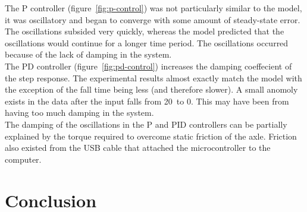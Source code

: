 \documentclass[12pt]{article} %
\begin{document}
\noindent The P controller (figure\ \ref{fig:p-control}) was not particularly similar to the model, it was oscillatory and began to converge with some amount of steady-state error. The oscillations subsided very quickly, whereas the model predicted that the oscillations would continue for a longer time period. The oscillations occurred because of the lack of damping in the system.
\\ 

\noindent The PD controller (figure\ \ref{fig:pd-control}) increases the damping coeffecient of the step response. The experimental results almost exactly match the model with the exception of the fall time being less (and therefore slower). A small anomoly exists in the data after the input falls from 20\degree\ to 0\degree. This may have been from having too much damping in the system. 
\\ 

\noindent The damping of the oscillations in the P and PID controllers can be partially explained by the torque required to overcome static friction of the axle. Friction also existed from the USB cable that attached the microcontroller to the computer.

\newpage

\section{Conclusion}


\blindtext

\blindtext

\blindtext
\end{document}
